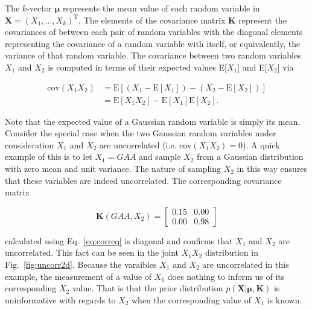 \noindent The $k$-vector $\boldsymbol{\mu}$ represents the mean value of each
random variable in $\mathbf{X}=(X_1,\dots,X_k)^{\text{T}}$.
The elements of the covariance matrix
$\mathbf{K}$ represent the covariances of between each pair of random variables
with the diagonal elements representing the covariance of a random variable
with itself, or equivalently, the variance of that random variable.
The covariance between two random variables $X_1$ and $X_2$ is computed in terms
of their expected values E[$X_1$] and E[$X_2$] via

\begin{align}
  \text{cov}(X_1X_2) &= \text{E}[(X_1-\text{E}[X_1]) - (X_2-\text{E}[X_2])] \\
  &= \text{E}[X_1X_2] - \text{E}[X_1]\text{E}[X_2].
  \label{eq:coveq}
\end{align}

\noindent Note that the expected value of a Gaussian random variable is simply
its mean. \\

Consider the special case when the two Gaussian random variables under
consideration $X_1$ and $X_2$ are uncorrelated (i.e. cov$(X_1X_2)=0$). A quick
example of this is to let $X_1=GAA$ and sample $X_2$ from a Gaussian distribution
with zero mean and unit variance. The nature of sampling $X_2$ in this way ensures
that these variables are indeed uncorrelated. The corresponding covariance matrix

\begin{equation}
  \mathbf{K}(GAA,X_2) =
  \begin{bmatrix}
    0.15 & 0.00 \\
    0.00 & 0.98
  \end{bmatrix}
\end{equation}

\noindent calculated using Eq.~\ref{eq:correq} is diagonal and confirms that
$X_1$ and $X_2$ are uncorrelated. This fact can be seen in the joint $X_1X_2$
distribution in Fig.~\ref{fig:uncorr2d}.
Because the varaibles $X_1$ and $X_2$ are uncorrelated in this example, the
measurement of a value of $X_1$ does nothing to inform us of its corresponding
$X_2$ value. That is that the prior distribution
$p(\mathbf{X}|\boldsymbol{\mu},\mathbf{K})$ is uninformative with regards to
$X_2$ when the corresponding value of $X_1$ is known. \\

